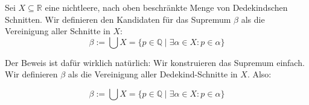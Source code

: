\begin{math-stroke}

\begin{short-proof}[Beweisidee]
Sei $X \subseteq \mathbb{R}$ eine nichtleere, nach oben beschränkte Menge von Dedekindschen Schnitten. Wir definieren den Kandidaten für das Supremum $\beta$ als die Vereinigung aller Schnitte in $X$:
\begin{equation}
\label{eq:supremum-konstruktion}
\beta := \bigcup X = \{ p \in \mathbb{Q} \mid \exists \alpha \in X \colon p \in \alpha \}
\end{equation}
\end{short-proof}
\end{math-stroke}

\begin{spoken-clean}[01:15:30 - 01:18:15]
Der Beweis ist dafür wirklich natürlich: Wir konstruieren das Supremum einfach. Wir definieren $\beta$ als die Vereinigung aller Dedekind-Schnitte in $X$. Also:
\end{spoken-clean}

\begin{math-stroke}
\[ \beta := \bigcup X = \{ p \in \mathbb{Q} \mid \exists \alpha \in X \colon p \in \alpha \} \]
\end{math-stroke}

